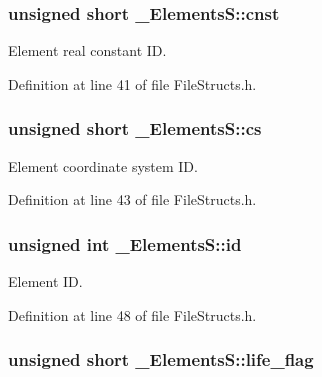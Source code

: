 \subsubsection[{\texorpdfstring{cnst}{cnst}}]{\setlength{\rightskip}{0pt plus 5cm}unsigned short \+\_\+\+Elements\+S\+::cnst}\hypertarget{struct___elements_s_ad11820e13b8992fd7465e5a3c4201e84}{}\label{struct___elements_s_ad11820e13b8992fd7465e5a3c4201e84}


Element real constant ID. 



Definition at line 41 of file File\+Structs.\+h.

\subsubsection[{\texorpdfstring{cs}{cs}}]{\setlength{\rightskip}{0pt plus 5cm}unsigned short \+\_\+\+Elements\+S\+::cs}\hypertarget{struct___elements_s_a59e50bef826fc636e452a480e42bb082}{}\label{struct___elements_s_a59e50bef826fc636e452a480e42bb082}


Element coordinate system ID. 



Definition at line 43 of file File\+Structs.\+h.

\subsubsection[{\texorpdfstring{id}{id}}]{\setlength{\rightskip}{0pt plus 5cm}unsigned int \+\_\+\+Elements\+S\+::id}\hypertarget{struct___elements_s_a782d0149d17748d22630799112b10680}{}\label{struct___elements_s_a782d0149d17748d22630799112b10680}


Element ID. 



Definition at line 48 of file File\+Structs.\+h.

\subsubsection[{\texorpdfstring{life\+\_\+flag}{life_flag}}]{\setlength{\rightskip}{0pt plus 5cm}unsigned short \+\_\+\+Elements\+S\+::life\+\_\+flag}\hypertarget{struct___elements_s_a966797bc046fea5472386a7a67867376}{}\label{struct___elements_s_a966797bc046fea5472386a7a67867376}


